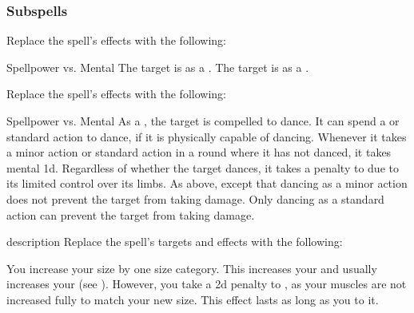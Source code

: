 \subsubsection{Subspells}
Replace the spell's effects with the following:
\begin{spellcontent}
\begin{augmenteffects}
\begin{spellattack}{Spellpower vs. Mental}
\spellsuccess The target is \disoriented as a .
\spellcritical The target is \confused as a .
\end{spellattack}
\end{augmenteffects}
\end{spellcontent}
Replace the spell's effects with the following:
\begin{spellcontent}
\begin{augmenteffects}
\begin{spellattack}{Spellpower vs. Mental}
\spellsuccess
As a , the target is compelled to dance.
It can spend a  or standard action to dance, if it is physically capable of dancing.
Whenever it takes a minor action or standard action in a round where it has not danced, it takes mental  \plus1d.
Regardless of whether the target dances, it takes a  penalty to  due to its limited control over its limbs.
\spellcritical
As above, except that dancing as a minor action does not prevent the target from taking damage.
Only dancing as a standard action can prevent the target from taking damage.
\end{spellattack}
\end{augmenteffects}
\end{spellcontent}
description
Replace the spell's targets and effects with the following:
\begin{spellcontent}
\begin{augmenttargetinginfo}
\end{augmenttargetinginfo}
\begin{augmenteffects}
\spelleffect
You increase your size by one size category.
This increases your  and usually increases your  (see ).
However, you take a \minus2d penalty to , as your muscles are not increased fully to match your new size.
This effect lasts as long as you  to it.
\end{augmenteffects}
\end{spellcontent}

